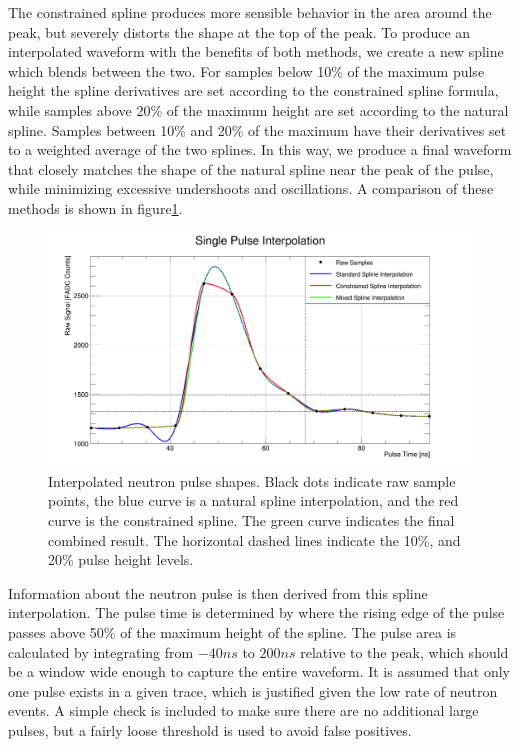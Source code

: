The constrained spline produces more sensible behavior in the area around the peak, but severely distorts the shape at the top of the peak.  
To produce an interpolated waveform with the benefits of both methods, we create a new spline which blends between the two.
For samples below 10\% of the maximum pulse height the spline derivatives are set according to the constrained spline formula, while samples above 20\% of the maximum height are set according to the natural spline.
Samples between 10\% and 20\% of the maximum have their derivatives set to a weighted average of the two splines.
In this way, we produce a final waveform that closely matches the shape of the natural spline near the peak of the pulse, while minimizing excessive undershoots and oscillations.
A comparison of these methods is shown in figure\ref{fig:neu_interp}.

\begin{figure}[h]
  \includegraphics[width=\textwidth]{software/figures/Neutron_Interpolation.png}
  \caption{Interpolated neutron pulse shapes. Black dots indicate raw sample points, the blue curve is a natural spline interpolation, and the red curve is the constrained spline.  The green curve indicates the final combined result. The horizontal dashed lines indicate the 10\%, and 20\% pulse height levels.}
  \label{fig:neu_interp}
\end{figure}

Information about the neutron pulse is then derived from this spline interpolation.
The pulse time is determined by where the rising edge of the pulse passes above 50\% of the maximum height of the spline.
The pulse area is calculated by integrating from $-40 ns$ to $200 ns$ relative to the peak, which should be a window wide enough to capture the entire waveform.
It is assumed that only one pulse exists in a given trace, which is justified given the low rate of neutron events.
A simple check is included to make sure there are no additional large pulses, but a fairly loose threshold is used to avoid false positives.

